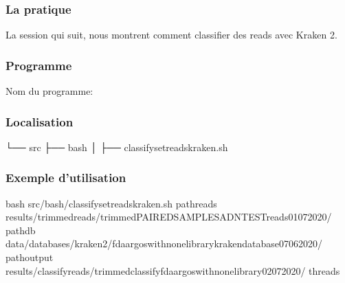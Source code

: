 \documentclass[letterpaper,10pt,french]{sphinxmanual}
\begin{document}
\subsubsection{La pratique}
\label{\detokenize{tutorial:id25}}
La session qui suit, nous montrent comment classifier des reads avec Kraken 2.


\subsubsection{Programme}
\label{\detokenize{tutorial:id26}}
Nom du programme:

\begin{sphinxVerbatim}[commandchars=\\\{\}]
\end{sphinxVerbatim}


\subsubsection{Localisation}
\label{\detokenize{tutorial:id27}}
\begin{sphinxVerbatim}[commandchars=\\\{\}]
└── src
 ├── bash
 │   ├── classify\PYGZus{}set\PYGZus{}reads\PYGZus{}kraken.sh
\end{sphinxVerbatim}


\subsubsection{Exemple d’utilisation}
\label{\detokenize{tutorial:id28}}
\begin{sphinxVerbatim}[commandchars=\\\{\}]
bash src/bash/classify\PYGZus{}set\PYGZus{}reads\PYGZus{}kraken.sh 
             \PYGZhy{}path\PYGZus{}reads results/trimmed\PYGZus{}reads/trimmed\PYGZus{}PAIRED\PYGZus{}SAMPLES\PYGZus{}ADN\PYGZus{}TEST\PYGZus{}reads\PYGZus{}01\PYGZus{}07\PYGZus{}2020/ 
             \PYGZhy{}path\PYGZus{}db data/databases/kraken\PYGZus{}2/fda\PYGZus{}argos\PYGZus{}with\PYGZus{}none\PYGZus{}library\PYGZus{}kraken\PYGZus{}database\PYGZus{}07\PYGZus{}06\PYGZus{}2020/ 
             \PYGZhy{}path\PYGZus{}output results/classify\PYGZus{}reads/trimmed\PYGZus{}classify\PYGZus{}fda\PYGZus{}argos\PYGZus{}with\PYGZus{}none\PYGZus{}library\PYGZus{}02\PYGZus{}07\PYGZus{}2020/ 
             \PYGZhy{}threads 
\end{sphinxVerbatim}
\end{document}
